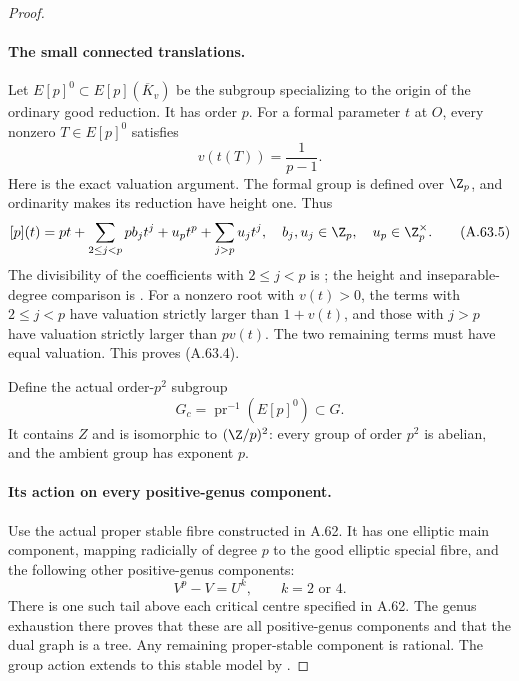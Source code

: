 \begin{proof}
\paragraph{The small connected translations.}
Let \(E[p]^0\subset E[p](\overline K_v)\) be the subgroup
specializing to the origin of the ordinary good reduction.
It has order \(p\). For a formal parameter \(t\) at \(O\),
every nonzero \(T\in E[p]^0\) satisfies
\[
                         v(t(T))=\frac1{p-1}.           \tag{A.63.4}
\]
Here is the exact valuation argument. The formal group is
defined over \(\Z_p\), and ordinarity makes its reduction
have height one. Thus
\[
 [p](t)=pt+\sum_{2\le j<p}p b_jt^j+u_pt^p
                       +\sum_{j>p}u_jt^j,
 \quad b_j,u_j\in\Z_p,\quad u_p\in\Z_p^\times.
                                                        \tag{A.63.5}
\]
The divisibility of the coefficients with \(2\le j<p\)
is \cite[Corollary IV.4.4, p.126]{fghSilvermanAEC};
the height and inseparable-degree comparison is
\cite[Theorem IV.7.4, p.134]{fghSilvermanAEC}.
For a nonzero root with \(v(t)>0\), the terms with
\(2\le j<p\) have valuation strictly larger than
\(1+v(t)\), and those with \(j>p\) have valuation
strictly larger than \(p v(t)\). The two remaining terms
must have equal valuation. This proves (A.63.4).

Define the actual order-\(p^2\) subgroup
\[
             G_c=\operatorname{pr}^{-1}(E[p]^0)\subset G.
                                                        \tag{A.63.6}
\]
It contains \(Z\) and is isomorphic to
\((\Z/p)^2\): every group of order \(p^2\) is abelian,
and the ambient group has exponent \(p\).

\paragraph{Its action on every positive-genus component.}
Use the actual proper stable fibre constructed in A.62.
It has one elliptic main component, mapping radicially of
degree \(p\) to the good elliptic special fibre, and the
following other positive-genus components:
\[
 V^p-V=U^k,\qquad k=2\text{ or }4.                       \tag{A.63.7}
\]
There is one such tail above each critical centre specified
in A.62. The genus exhaustion there proves that these are
all positive-genus components and that the dual graph is a
tree. Any remaining proper-stable component is rational.
The group action extends to this stable model by
\cite[Proposition 10.1.16 and Theorem 10.3.34(b),
pp.460--461 and 518--519]{fghLiu}.


\end{proof}
